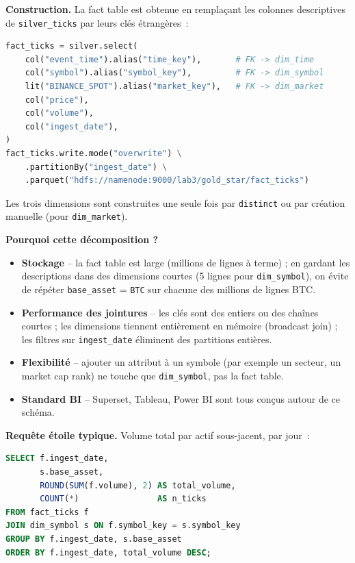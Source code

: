 \documentclass{RapportINPTCLOUD}
\begin{document}
\textbf{Construction.} La fact table est obtenue en remplaçant les colonnes descriptives de \texttt{silver\_ticks} par leurs cl\'{e}s \'{e}trang\`{e}res~:

\begin{lstlisting}[style=code, language=Python]
fact_ticks = silver.select(
    col("event_time").alias("time_key"),       # FK -> dim_time
    col("symbol").alias("symbol_key"),         # FK -> dim_symbol
    lit("BINANCE_SPOT").alias("market_key"),   # FK -> dim_market
    col("price"),
    col("volume"),
    col("ingest_date"),
)
fact_ticks.write.mode("overwrite") \
    .partitionBy("ingest_date") \
    .parquet("hdfs://namenode:9000/lab3/gold_star/fact_ticks")
\end{lstlisting}

Les trois dimensions sont construites une seule fois par \texttt{distinct} ou par cr\'{e}ation manuelle (pour \texttt{dim\_market}).

\textbf{Pourquoi cette d\'{e}composition ?}
\begin{itemize}[leftmargin=2em]
    \item \textbf{Stockage} -- la fact table est large (millions de lignes \`{a} terme) ; en gardant les descriptions dans des dimensions courtes (5 lignes pour \texttt{dim\_symbol}), on \'{e}vite de r\'{e}p\'{e}ter \texttt{base\_asset} = \texttt{BTC} sur chacune des millions de lignes BTC.
    \item \textbf{Performance des jointures} -- les cl\'{e}s sont des entiers ou des cha\^{i}nes courtes ; les dimensions tiennent enti\`{e}rement en m\'{e}moire (broadcast join) ; les filtres sur \texttt{ingest\_date} \'{e}liminent des partitions enti\`{e}res.
    \item \textbf{Flexibilit\'{e}} -- ajouter un attribut \`{a} un symbole (par exemple un secteur, un \og market cap rank\fg{}) ne touche que \texttt{dim\_symbol}, pas la fact table.
    \item \textbf{Standard BI} -- Superset, Tableau, Power BI sont tous con\c{c}us autour de ce sch\'{e}ma.
\end{itemize}

\textbf{Requ\^{e}te \'{e}toile typique.} Volume total par actif sous-jacent, par jour~:

\begin{lstlisting}[style=code, language=SQL]
SELECT f.ingest_date,
       s.base_asset,
       ROUND(SUM(f.volume), 2) AS total_volume,
       COUNT(*)                AS n_ticks
FROM fact_ticks f
JOIN dim_symbol s ON f.symbol_key = s.symbol_key
GROUP BY f.ingest_date, s.base_asset
ORDER BY f.ingest_date, total_volume DESC;
\end{lstlisting}
\end{document}
